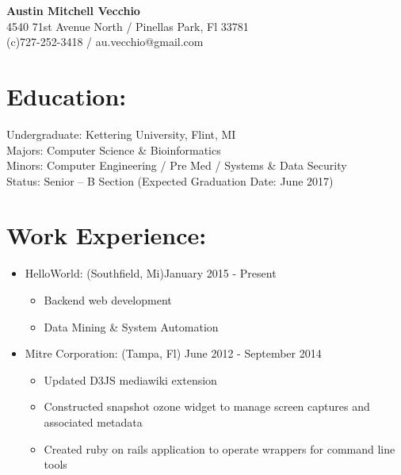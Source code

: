 \documentclass{res}
\begin{document}
\begin{center}
\LARGE{\textbf{Austin Mitchell Vecchio}}\\
\normalsize{
4540 71st Avenue North / Pinellas Park, Fl 33781\\
(c)727-252-3418 / au.vecchio@gmail.com
}
\end{center}

\section{Education:}
Undergraduate: Kettering University, Flint, MI\\
Majors: Computer Science \& Bioinformatics\\
Minors: Computer Engineering / Pre Med / Systems \& Data Security\\
Status: Senior – B Section (Expected Graduation Date: June 2017)

\section{Work Experience:}
\begin{itemize}[leftmargin=*]
\item HelloWorld: (Southfield, Mi)\hfill January 2015 - Present
\begin{itemize}[label=$\circ$]
\item Backend web development
\item Data Mining \& System Automation
\end{itemize}
\item Mitre Corporation: (Tampa, Fl) \hfill June 2012 - September 2014
\begin{itemize}[label=$\circ$]
\item Updated D3JS mediawiki extension
\item Constructed snapshot ozone widget to manage screen captures and associated metadata
\item Created ruby on rails application to operate wrappers for command line tools
\end{itemize}
\end{itemize}
\end{document}
